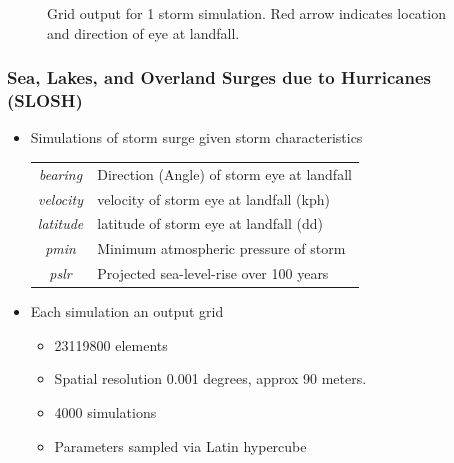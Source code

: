 \documentclass[aspectratio=169,10pt,notes]{beamer}
\begin{document}
\begin{frame}
\begin{minipage}{0.45\textwidth}
\begin{figure}
        \caption{Grid output for 1 storm simulation.  Red arrow indicates location and direction of eye at landfall.}
    \end{figure}
    \end{minipage}
\end{frame} %


\begin{frame}
    \frametitle{Sea, Lakes, and Overland Surges due to Hurricanes (SLOSH)}
    \begin{minipage}{0.54\textwidth}
    {\footnotesize
    \begin{itemize}
        \item Simulations of storm surge given storm characteristics \par
        \begin{tabular}{cl}
            \textit{bearing}  & Direction (Angle) of storm eye at landfall \\
            \textit{velocity} & velocity of storm eye at landfall (kph)    \\
            \textit{latitude} & latitude of storm eye at landfall (dd)     \\
            \textit{pmin}     & Minimum atmospheric pressure of storm      \\
            \textit{pslr}     & Projected sea-level-rise over 100 years    \\
            \end{tabular}
        \item Each simulation an output grid
        \begin{itemize}
            \item \num{23119800} elements
            \item Spatial resolution 0.001 degrees, approx 90 meters.
        \item 4000 simulations
        \item Parameters sampled via Latin hypercube
        \end{itemize}
    \end{itemize}
    }
    \end{minipage}%
    ~
    \begin{minipage}{0.44\textwidth}

\end{minipage}
\end{frame}
\end{document}

